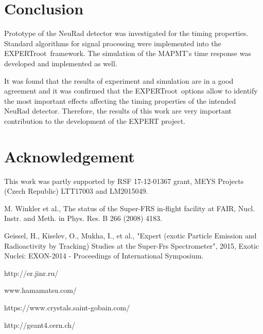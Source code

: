 \documentclass{webofc}
\newcommand{\er}{\textmd{EXPERTroot}}
\begin{document}
	
	
	


\section{Conclusion}
	
	Prototype of the NeuRad detector was investigated for the timing properties.
	Standard algorithms for signal processing were implemented into the \er\ framework. The simulation of the MAPMT's time response was developed and implemented as well.
	
	
	It was found that the results of experiment and simulation are in a good agreement and it was confirmed that the \er\ options allow to identify the most important effects affecting the timing properties of the intended NeuRad detector.
	Therefore, the results of this work are very important contribution to the development of the EXPERT project.

\section{Acknowledgement}	
	This  work was partly supported by RSF 17-12-01367 grant, MEYS Projects (Czech Republic) LTT17003 and LM2015049.
\begin{thebibliography}{99}
	
	M. Winkler et al., The status of the Super-FRS in-flight facility at FAIR, Nucl. Instr. and Meth. in Phys. Res. B 266 (2008) 4183.
	
	Geissel, H., Kiselev, O., Mukha, I., et al., "Expert (exotic Particle Emission and Radioactivity by Tracking) Studies at the Super-Frs Spectrometer", 2015, Exotic Nuclei: EXON-2014 - Proceedings of International Symposium.
	
	http://er.jinr.ru/
	
	www.hamamatsu.com/
	
	https://www.crystals.saint-gobain.com/
	
	http://geant4.cern.ch/
	
\end{thebibliography}
\end{document}
